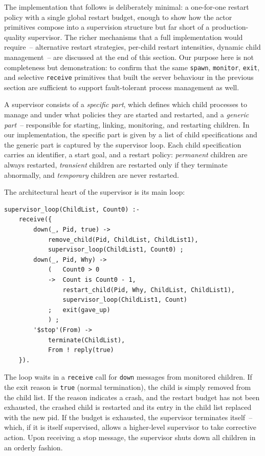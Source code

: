 The implementation that follows is deliberately minimal: a one-for-one
restart policy with a single global restart budget, enough to show how the
actor primitives compose into a supervision structure but far short of a
production-quality supervisor. The richer mechanisms that a full
implementation would require~-- alternative restart strategies, per-child
restart intensities, dynamic child management~-- are discussed at the end
of this section. Our purpose here is not completeness but demonstration: to
confirm that the same \texttt{spawn}, \texttt{monitor}, \texttt{exit}, and
selective \texttt{receive} primitives that built the server behaviour in
the previous section are sufficient to support fault-tolerant process
management as well.

A supervisor consists of a \emph{specific part}, which defines which child
processes to manage and under what policies they are started and restarted,
and a \emph{generic part}~-- responsible for starting, linking, monitoring,
and restarting children. In our implementation, the specific part is given
by a list of child specifications and the generic part is captured by the
supervisor loop. Each child specification carries an identifier, a start
goal, and a restart policy: \emph{permanent} children are always restarted,
\emph{transient} children are restarted only if they terminate abnormally,
and \emph{temporary} children are never restarted.

The architectural heart of the supervisor is its main loop:
%
\begin{verbatim}
supervisor_loop(ChildList, Count0) :-
    receive({
        down(_, Pid, true) ->
            remove_child(Pid, ChildList, ChildList1),
            supervisor_loop(ChildList1, Count0) ;
        down(_, Pid, Why) ->
            (   Count0 > 0
            ->  Count is Count0 - 1,
                restart_child(Pid, Why, ChildList, ChildList1),
                supervisor_loop(ChildList1, Count)
            ;   exit(gave_up)
            ) ;
        '$stop'(From) ->
            terminate(ChildList),
            From ! reply(true)
    }).
\end{verbatim}
%
The loop waits in a \texttt{receive} call for \texttt{down} messages from
monitored children. If the exit reason is \texttt{true} (normal
termination), the child is simply removed from the child list. If the
reason indicates a crash, and the restart budget has not been exhausted, the
crashed child is restarted and its entry in the child list replaced with
the new pid. If the budget is exhausted, the supervisor terminates
itself~-- which, if it is itself supervised, allows a higher-level
supervisor to take corrective action. Upon receiving a stop message, the
supervisor shuts down all children in an orderly fashion.

